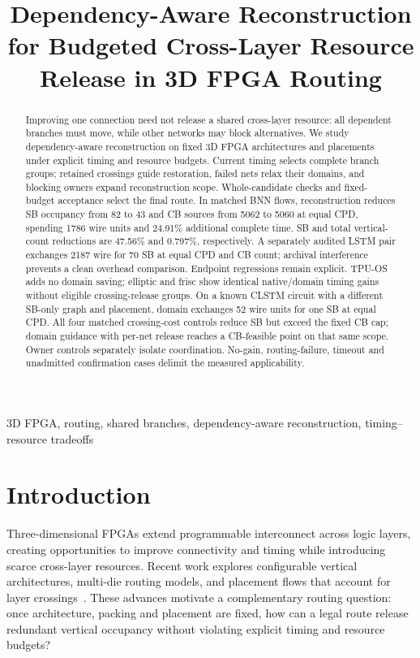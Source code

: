 \documentclass[conference,10pt]{IEEEtran}
\title{Dependency-Aware Reconstruction for Budgeted Cross-Layer Resource Release in 3D FPGA Routing}
\author{\IEEEauthorblockN{Anonymous submission}}
\begin{document}
\maketitle
\begin{abstract}
Improving one connection need not release a shared cross-layer resource: all dependent branches must move, while other networks may block alternatives. We study dependency-aware reconstruction on fixed 3D FPGA architectures and placements under explicit timing and resource budgets. Current timing selects complete branch groups; retained crossings guide restoration, failed nets relax their domains, and blocking owners expand reconstruction scope. Whole-candidate checks and fixed-budget acceptance select the final route. In matched BNN flows, reconstruction reduces SB occupancy from 82 to 43 and CB sources from 5062 to 5060 at equal CPD, spending 1786 wire units and 24.91\% additional complete time. SB and total vertical-count reductions are 47.56\% and 0.797\%, respectively. A separately audited LSTM pair exchanges 2187 wire for 70 SB at equal CPD and CB count; archival interference prevents a clean overhead comparison. Endpoint regressions remain explicit. TPU-OS adds no domain saving; elliptic and frisc show identical native/domain timing gains without eligible crossing-release groups. On a known CLSTM circuit with a different SB-only graph and placement, domain exchanges 52 wire units for one SB at equal CPD. All four matched crossing-cost controls reduce SB but exceed the fixed CB cap; domain guidance with per-net release reaches a CB-feasible point on that same scope. Owner controls separately isolate coordination. No-gain, routing-failure, timeout and unadmitted confirmation cases delimit the measured applicability.
\end{abstract}
\begin{IEEEkeywords}
3D FPGA, routing, shared branches, dependency-aware reconstruction, timing--resource tradeoffs
\end{IEEEkeywords}

\section{Introduction}
Three-dimensional FPGAs extend programmable interconnect across logic layers, creating opportunities to improve connectivity and timing while introducing scarce cross-layer resources. Recent work explores configurable vertical architectures, multi-die routing models, and placement flows that account for layer crossings~\cite{lazagna,multidie,flatland}. These advances motivate a complementary routing question: once architecture, packing and placement are fixed, how can a legal route release redundant vertical occupancy without violating explicit timing and resource budgets?
\end{document}
